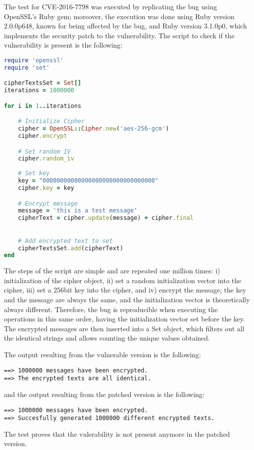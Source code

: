 The test for CVE-2016-7798 was executed by replicating the bug using OpenSSL's Ruby gem; moreover, the execution was done using Ruby version 2.0.0p648, known for being affected by the bug, and Ruby version 3.1.0p0, which implements the security patch to the vulnerability. The script to check if the vulnerability is present is the following: 
\begin{lstlisting}[language=Ruby]
require 'openssl'
require 'set'

cipherTextsSet = Set[]
iterations = 1000000

for i in 1..iterations

    # Initialize Cipher
    cipher = OpenSSL::Cipher.new('aes-256-gcm')
    cipher.encrypt

    # Set random IV
    cipher.random_iv
 
    # Set key
    key = "00000000000000000000000000000000"
    cipher.key = key

    # Encrypt message
    message = 'this is a test message'
    cipherText = cipher.update(message) + cipher.final

    
    # Add encrypted text to set
    cipherTextsSet.add(cipherText)
end
\end{lstlisting}

The steps of the script are simple and are repeated one million times: i) initialization of the cipher object, ii) set a random initialization vector into the cipher, iii) set a 256bit key into the cipher, and iv) encrypt the message; the key and the message are always the same, and the initialization vector is theoretically always different. Therefore, the bug is reproducible when executing the operations in this same order, having the initialization vector set before the key. The encrypted messages are then inserted into a Set object, which filters out all the identical strings and allows counting the unique values obtained.

The output resulting from the vulnerable version is the following:
\begin{verbatim}
==> 1000000 messages have been encrypted.
==> The encrypted texts are all identical.
\end{verbatim}

and the output resulting from the patched version is the following:
\begin{verbatim}
==> 1000000 messages have been encrypted.
==> Succesfully generated 1000000 different encrypted texts.
\end{verbatim}

The test proves that the vulerability is not present anymore in the patched version.



